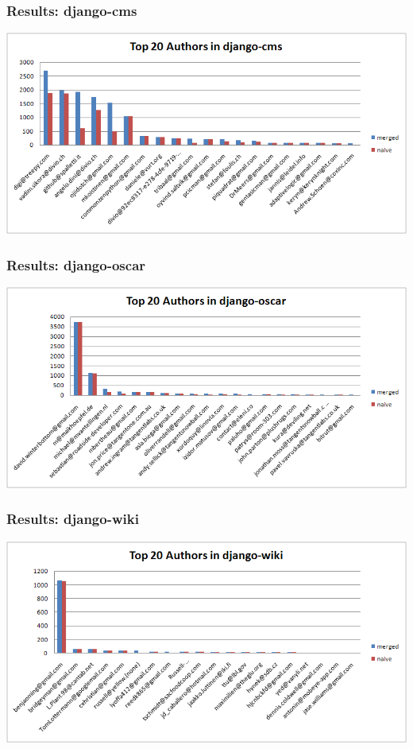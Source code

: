 \documentclass[slidestop,usenames,dvipsnames]{beamer}
\begin{document}
\begin{frame}
  \frametitle{Results: django-cms}
  \vfill
  \includegraphics[width=\textwidth]{img/graph-django-cms}
  \vfill
\end{frame}

\begin{frame}
  \frametitle{Results: django-oscar}
  \vfill
  \includegraphics[width=\textwidth]{img/graph-django-oscar}
  \vfill
\end{frame}

\begin{frame}
  \frametitle{Results: django-wiki}
  \vfill
  \includegraphics[width=\textwidth]{img/graph-django-wiki}
  \vfill
\end{frame}
\end{document}
